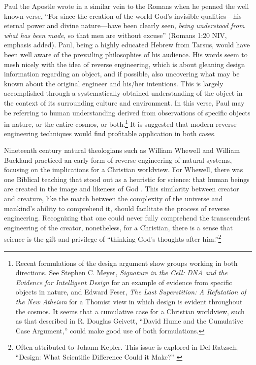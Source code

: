 Paul the Apostle wrote in a similar vein to the Romans when he penned
the well known verse, “For since the creation of the
world God's invisible qualities---his eternal power
and divine nature---have been clearly seen,
\textit{being understood from what has been
made}, so that men are without
excuse” (Romans 1:20 NIV, emphasis added).
Paul, being a highly educated Hebrew from Tarsus, would have been well
aware of the prevailing philosophies of his audience. His words seem to
mesh nicely with the idea of reverse engineering, which is about
gleaning design information regarding an object,
and if possible, also uncovering what may be
known about the original engineer and his/her
intentions. This is largely accomplished through a
systematically obtained understanding of the object in the context of
its surrounding culture and environment. In this verse, Paul may be
referring to human understanding derived from observations of specific
objects in nature, or the entire cosmos, or
both.\footnote{%
Recent formulations of the design argument show
groups working in both directions. See Stephen C. Meyer,
\textit{Signature in the Cell: DNA and the Evidence for Intelligent
Design} \citep{meyer2009} for an example of evidence from
specific objects in nature, and Edward Feser, \textit{The Last
Superstition: A Refutation of the New Atheism} \citep{feser2008}
for a Thomist view in which design is evident
throughout the cosmos. It seems that a cumulative case for a Christian
worldview, such as that described in R. Douglas Geivett, “David Hume
and the Cumulative Case Argument,” \citep{geivett2005}
could make
good use of both formulations.
}
It is
suggested that modern reverse engineering techniques would find
profitable application in both cases.

Nineteenth century natural theologians such as William Whewell and
William Buckland practiced an early form of reverse engineering of
natural systems, focusing on the implications for a Christian
worldview. For Whewell, there was one Biblical teaching that stood out
as a heuristic for science: that human beings are created in the image
and likeness of God \citep[][p.~283]{fuller2006}. This similarity between
creator and creature, like the match between the complexity of the
universe and mankind’s ability to comprehend it, should facilitate the
process of reverse engineering. Recognizing that one could never fully
comprehend the transcendent engineering of the creator, nonetheless,
for a Christian, there is a sense that science is the gift and
privilege of ``thinking God’s thoughts after him.''\footnote{%
Often attributed to Johann Kepler. This issue is
explored in Del Ratzsch, ``Design: What Scientific Difference Could it
Make?'' \citep{ratzsch2004}
}


